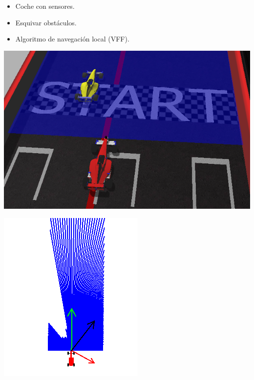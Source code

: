\documentclass[notes,slidesec,a4]{seminar}
\begin{document}
\begin{hslide}
	\begin{itemize}
		\item Coche con sensores.
		\item Esquivar obstáculos.
		\item Algoritmo de navegación local (VFF).
	\end{itemize}
	\begin{center}
		\begin{minipage}[t]{0.55\textwidth}
			\includegraphics[width=\textwidth]{vff-gazebo.png}
		\end{minipage}
		\begin{minipage}[t]{0.25\textwidth}
			\includegraphics[width=\textwidth]{vff-gui.png}
		\end{minipage}
	\end{center}
\end{hslide}
\end{document}
